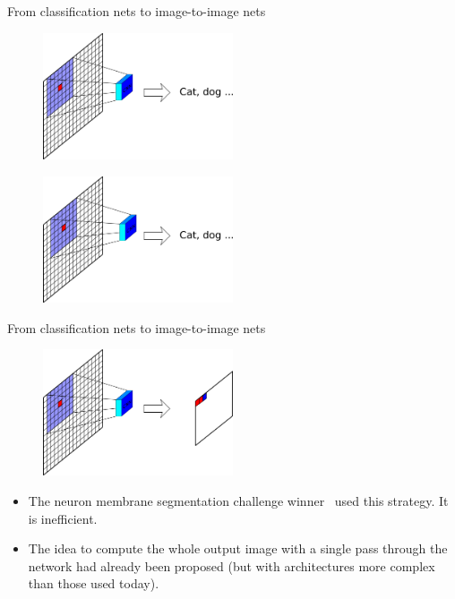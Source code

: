 \documentclass[xcolor=pdftex,dvipsnames,table,mathserif]{beamer}
\begin{document}
\begin{frame}{From classification nets to image-to-image nets}

      \begin{figure}
      \includegraphics[width=0.5\textwidth]{image_transf1.png}
      \end{figure}

      \pause

      \begin{figure}
      \includegraphics[width=0.5\textwidth]{image_transf2.png}
      \end{figure}

\end{frame}

\begin{frame}{From classification nets to image-to-image nets}

      \begin{figure}
      \includegraphics[width=0.5\textwidth]{image_transf_fin.png}
      \end{figure}

      \begin{itemize}
      \item The neuron membrane segmentation challenge winner~\cite{ciresan_deep_2012} used this strategy. It is inefficient.
      \item The idea to compute the whole output image with a single pass through the network had already been proposed \cite{feng_ning_toward_2005, jain_supervised_2007} (but with architectures more complex than those used today).
      \end{itemize}

\end{frame}
\end{document}
